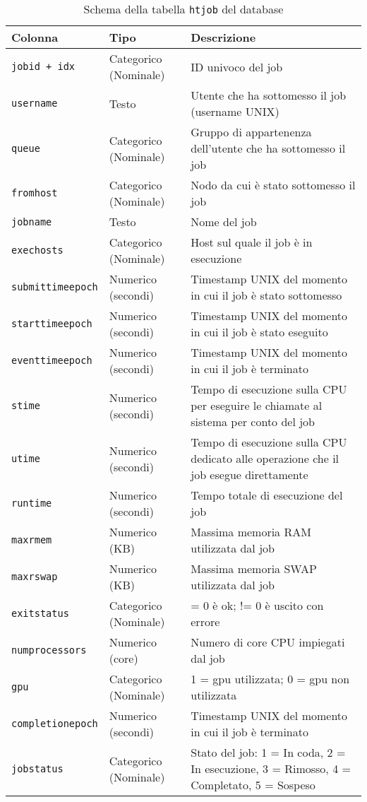 \begin{table}[p]
  \centering
  \caption{Schema della tabella \texttt{htjob} del database}
  \footnotesize
  \begin{tabular}{llp{6cm}}
    \toprule
    \textbf{Colonna} & \textbf{Tipo} & \textbf{Descrizione} \\
    \midrule
    \texttt{jobid + idx} & Categorico (Nominale) & ID univoco del job \\
    \texttt{username} & Testo & Utente che ha sottomesso il job (username UNIX) \\
    \texttt{queue} & Categorico (Nominale) & Gruppo di appartenenza dell'utente che ha sottomesso il
    job \\
    \texttt{fromhost} & Categorico (Nominale) & Nodo da cui è stato sottomesso il job \\
    \texttt{jobname} & Testo & Nome del job \\
    \texttt{exechosts} & Categorico (Nominale) & Host sul quale il job è in esecuzione \\
    \texttt{submittimeepoch} & Numerico (secondi) & Timestamp UNIX del momento in cui il
    job è stato sottomesso \\
    \texttt{starttimeepoch} & Numerico (secondi) & Timestamp UNIX del momento in cui il
    job è stato eseguito \\
    \texttt{eventtimeepoch} & Numerico (secondi) & Timestamp UNIX del momento in cui il
    job è terminato \\
    \texttt{stime} & Numerico (secondi) & Tempo di esecuzione sulla CPU per
    eseguire le chiamate al sistema per conto del job \\
    \texttt{utime} & Numerico (secondi) & Tempo di esecuzione sulla CPU
    dedicato alle operazione che il job esegue direttamente \\
    \texttt{runtime} & Numerico (secondi) & Tempo totale di esecuzione del job \\
    \texttt{maxrmem} & Numerico (KB) & Massima memoria RAM utilizzata dal job \\
    \texttt{maxrswap} & Numerico (KB) & Massima memoria SWAP utilizzata dal job \\
    \texttt{exitstatus} & Categorico (Nominale) & = 0 è ok; != 0 è uscito con errore \\
    \texttt{numprocessors} & Numerico (core) & Numero di core CPU impiegati dal job \\
    \texttt{gpu} & Categorico (Nominale) & 1 = gpu utilizzata; 0 = gpu non utilizzata \\
    \texttt{completionepoch} & Numerico (secondi) & Timestamp UNIX del momento in cui il
    job è terminato \\
    \texttt{jobstatus} & Categorico (Nominale) & Stato del job: 1 = In coda, 2 = In esecuzione, 3 = Rimosso, 4 = Completato, 5 = Sospeso \\
    \bottomrule
  \end{tabular}
  \label{table:schema_htjob}
\end{table}

